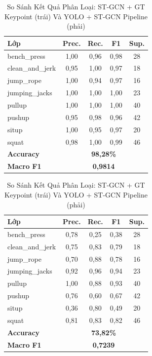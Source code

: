 \documentclass[conference]{IEEEtran}
\begin{document}
\begin{table}[!t]
\caption{So Sánh Kết Quả Phân Loại: ST-GCN + GT Keypoint (trái) Và YOLO + ST-GCN Pipeline (phải)}
\label{tab:comparison_results}
\centering
\begin{minipage}{0.47\textwidth}
\centering\small
\begin{tabular}{lcccc}
\toprule
Lớp & Prec. & Rec. & F1 & Sup. \\
\midrule
bench\_press     & 1,00 & 0,96 & 0,98 & 28 \\
clean\_and\_jerk & 0,95 & 1,00 & 0,97 & 18 \\
jump\_rope       & 1,00 & 0,94 & 0,97 & 16 \\
jumping\_jacks   & 1,00 & 1,00 & 1,00 & 23 \\
pullup           & 1,00 & 1,00 & 1,00 & 40 \\
pushup           & 0,95 & 0,98 & 0,96 & 42 \\
situp            & 1,00 & 0,95 & 0,97 & 20 \\
squat            & 0,98 & 1,00 & 0,99 & 46 \\
\midrule
\textbf{Accuracy} & \multicolumn{4}{c}{\textbf{98,28\%}} \\
\textbf{Macro F1} & \multicolumn{4}{c}{\textbf{0,9814}} \\
\bottomrule
\end{tabular}
\end{minipage}
\hfill
\begin{minipage}{0.47\textwidth}
\centering\small
\begin{tabular}{lcccc}
\toprule
Lớp & Prec. & Rec. & F1 & Sup. \\
\midrule
bench\_press     & 0,78 & 0,25 & 0,38 & 28 \\
clean\_and\_jerk & 0,75 & 0,83 & 0,79 & 18 \\
jump\_rope       & 0,70 & 0,88 & 0,78 & 16 \\
jumping\_jacks   & 0,92 & 0,96 & 0,94 & 23 \\
pullup           & 1,00 & 0,88 & 0,93 & 40 \\
pushup           & 0,76 & 0,60 & 0,67 & 42 \\
situp            & 0,36 & 0,80 & 0,49 & 20 \\
squat            & 0,81 & 0,83 & 0,82 & 46 \\
\midrule
\textbf{Accuracy} & \multicolumn{4}{c}{\textbf{73,82\%}} \\
\textbf{Macro F1} & \multicolumn{4}{c}{\textbf{0,7239}} \\
\bottomrule
\end{tabular}
\end{minipage}
\end{table}
\end{document}
